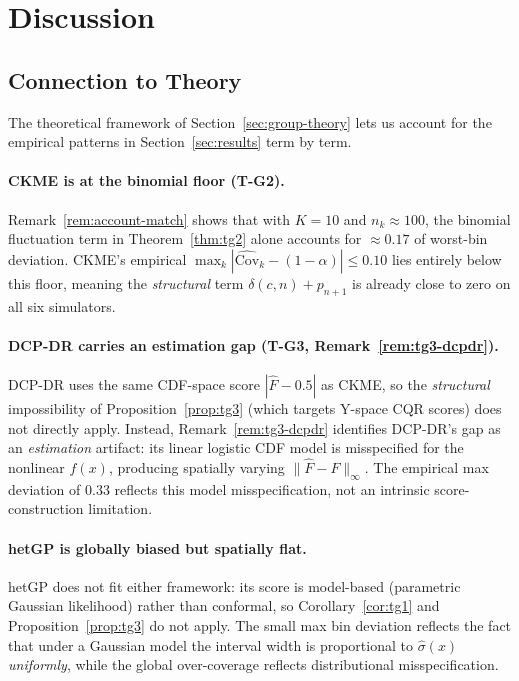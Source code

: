 \documentclass[11pt]{article}
\theoremstyle{remark}
\begin{document}
\section{Discussion}
\label{sec:discussion}

\subsection{Connection to Theory}

The theoretical framework of Section~\ref{sec:group-theory} lets us
account for the empirical patterns in Section~\ref{sec:results} term
by term.

\paragraph{CKME is at the binomial floor (T-G2).}
Remark~\ref{rem:account-match} shows that with $K=10$ and
$n_k \approx 100$, the binomial fluctuation term in
Theorem~\ref{thm:tg2} alone accounts for $\approx 0.17$ of worst-bin
deviation. CKME's empirical $\max_k |\widehat{\mathrm{Cov}}_k -
(1-\alpha)| \le 0.10$ lies entirely below this floor, meaning the
\emph{structural} term $\delta(c,n) + p_{n+1}$ is already close to
zero on all six simulators.

\paragraph{DCP-DR carries an estimation gap (T-G3, Remark~\ref{rem:tg3-dcpdr}).}
DCP-DR uses the same CDF-space score $|\hat F - 0.5|$ as CKME, so the
\emph{structural} impossibility of Proposition~\ref{prop:tg3} (which
targets Y-space CQR scores) does not directly apply. Instead,
Remark~\ref{rem:tg3-dcpdr} identifies DCP-DR's gap as an
\emph{estimation} artifact: its linear logistic CDF model is
misspecified for the nonlinear $f(x)$, producing spatially varying
$\|\hat F - F\|_\infty$. The empirical max deviation of $0.33$ reflects
this model misspecification, not an intrinsic score-construction
limitation.

\paragraph{hetGP is globally biased but spatially flat.}
hetGP does not fit either framework: its score is model-based
(parametric Gaussian likelihood) rather than conformal, so
Corollary~\ref{cor:tg1} and Proposition~\ref{prop:tg3} do not apply.
The small max bin deviation reflects the fact that under a Gaussian
model the interval width is proportional to $\hat\sigma(x)$
\emph{uniformly}, while the global over-coverage reflects
distributional misspecification.
\end{document}
